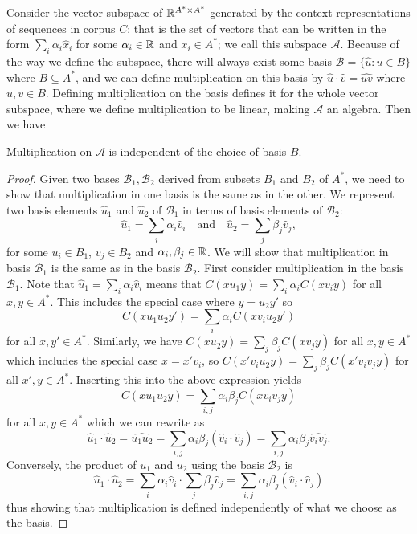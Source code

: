 \documentclass[11pt]{report}
\begin{document}
Consider the vector subspace of $\mathbb{R}^{A^* \times A^*}$ generated by the context representations of sequences in corpus $C$; that is the set of vectors that can be written in the form $\sum_i \alpha_i \hat{x}_i$ for some $\alpha_i \in \mathbb{R}$  and $x_i \in A^*$; we call this subspace $\mathcal{A}$. Because of the way we define the subspace, there will always exist some basis $\mathcal{B} = \{\hat{u} : u \in B\}$ where $B \subseteq A^*$, and we can define multiplication on this basis by $\hat{u}\cdot\hat{v} = \widehat{uv}$ where $u,v \in B$. Defining multiplication on the basis defines it for the whole vector subspace, where we define multiplication to be linear, making $\mathcal{A}$ an algebra.
Then we have
\begin{prop}
Multiplication on $\mathcal{A}$ is independent of the choice of basis $B$.
\end{prop}
\begin{proof}
Given two bases $\mathcal{B}_1 , \mathcal{B}_2$ derived from subsets $B_1$ and $B_2$ of $A^*$, we need to show that multiplication in one basis is the same as in the other. We represent two basis elements $\hat{u}_1$ and $\hat{u}_2$ of $\mathcal{B}_1$ in terms of basis elements of $\mathcal{B}_2$:
$$\hat{u}_1 = \sum_i \alpha_i \hat{v}_i \quad\text{and}\quad
\hat{u}_2 = \sum_j \beta_j \hat{v}_j,$$
for some $u_i \in B_1$, $v_j \in B_2$ and $\alpha_i, \beta_j  \in \mathbb{R}$.
We will show that multiplication in basis $\mathcal{B}_1$ is the same as in the basis $\mathcal{B}_2$. First consider multiplication in the basis $\mathcal{B}_1$. Note that $\hat{u}_1 = \sum_i \alpha_i \hat{v}_i$ means that $C(xu_1y) = \sum_i \alpha_i C(xv_iy)$ for all $x,y \in A^*$. This includes the special case where $y = u_2y'$ so $$C(xu_1u_2y') = \sum_i \alpha_i C(xv_iu_2y')$$ for all $x, y' \in A^*$.
Similarly, we have $C(xu_2y) = \sum_j \beta_j C(xv_jy)$ for all $x,y \in A^*$ which includes the special case $x = x'v_i$, so $C(x'v_iu_2y) = \sum_j \beta_j C(x'v_iv_jy)$ for all $x',y \in A^*$. Inserting this into the above expression yields
$$C(xu_1u_2y) = \sum_{i,j} \alpha_i\beta_j C(xv_iv_jy)$$
for all $x,y \in A^*$ which we can rewrite as
$$\hat{u}_1\cdot\hat{u}_2 = \widehat{u_1u_2} = \sum_{i,j}\alpha_i\beta_j (\hat{v}_i\cdot\hat{v}_j)
= \sum_{i,j}\alpha_i\beta_j \widehat{v_iv_j}.$$
Conversely, the product of $u_1$ and $u_2$ using the basis $\mathcal{B}_2$ is
$$\hat{u}_1\cdot \hat{u}_2 = \sum_i \alpha_i \hat{v}_i \cdot \sum_j \beta_j \hat{v}_j =  \sum_{i,j}\alpha_i\beta_j (\hat{v}_i\cdot\hat{v}_j)$$
thus showing that multiplication is defined independently of what we choose as the basis.
\end{proof}
\end{document}
